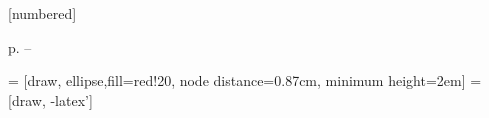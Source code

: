 \def\bbullet{\leavevmode\usebeamertemplate{itemize item}\ }

\newtheorem{proposition}[theorem]{Proposition}
\newtheorem{property}[theorem]{Property}
\newtheorem{importantproperty}[theorem]{Property}
\newtheorem{importanttheorem}[theorem]{Theorem}
[numbered]

%

\def\red{\color[rgb]{1,0,0}}
\def\blue{\color[rgb]{0,0,1}}
\def\green{\color[rgb]{0,1,0}}



{%
\quad p. \insertpagenumber \quad--\quad \insertsection\vskip2pt
}


\makeatletter
\newlength\beamerleftmargin
\setlength\beamerleftmargin{\Gm@lmargin}
\makeatother


\usepackage{tikz}
\usetikzlibrary{shapes,arrows}
\usetikzlibrary{positioning}
\usetikzlibrary{shapes.symbols,shapes.callouts,patterns}
\usetikzlibrary{calc,fit}
\usetikzlibrary{backgrounds}
\usetikzlibrary{decorations.pathmorphing,fit,petri}
\usetikzlibrary{automata}
\usetikzlibrary{fadings}
\usetikzlibrary{patterns,hobby}

\usetikzlibrary{backgrounds,fit,petri}


\usepackage{pgfplots}
\pgfplotsset{compat=1.6}
\pgfplotsset{ticks=none}

\usetikzlibrary{decorations.markings}
\usetikzlibrary{arrows.meta}
\tikzset{>=stealth}

\usetikzlibrary{shapes,arrows}
\usetikzlibrary{positioning}
 = [draw, ellipse,fill=red!20, node distance=0.87cm,
minimum height=2em]
 = [draw, -latex']


\newenvironment{changemargin}[2]{%
\begin{list}{}{%
\setlength{\topsep}{0pt}%
\setlength{\leftmargin}{#1}%
\setlength{\rightmargin}{#2}%
\setlength{\listparindent}{\parindent}%
\setlength{\itemindent}{\parindent}%
\setlength{\parsep}{\parskip}%
}%
\item[]}{\end{list}}


